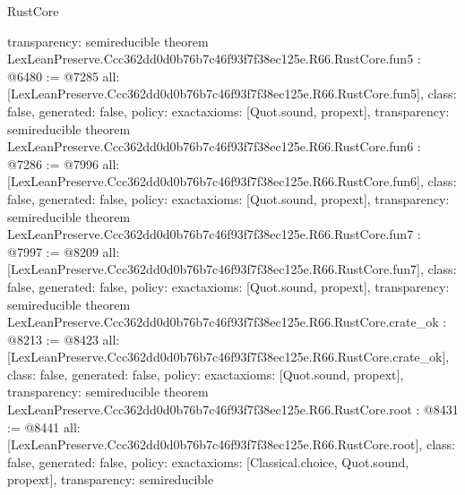 \begin{lexlean}{RustCore}
\begin{coremodule}
{  transparency: semireducible
}
theorem LexLeanPreserve.Ccc362dd0d0b76b7c46f93f7f38ec125e.R66.RustCore.fun5 : @6480 := @7285 {
  all: [LexLeanPreserve.Ccc362dd0d0b76b7c46f93f7f38ec125e.R66.RustCore.fun5],
  class: false,
  generated: false,
  policy: exact{axioms: [Quot.sound, propext]},
  transparency: semireducible
}
theorem LexLeanPreserve.Ccc362dd0d0b76b7c46f93f7f38ec125e.R66.RustCore.fun6 : @7286 := @7996 {
  all: [LexLeanPreserve.Ccc362dd0d0b76b7c46f93f7f38ec125e.R66.RustCore.fun6],
  class: false,
  generated: false,
  policy: exact{axioms: [Quot.sound, propext]},
  transparency: semireducible
}
theorem LexLeanPreserve.Ccc362dd0d0b76b7c46f93f7f38ec125e.R66.RustCore.fun7 : @7997 := @8209 {
  all: [LexLeanPreserve.Ccc362dd0d0b76b7c46f93f7f38ec125e.R66.RustCore.fun7],
  class: false,
  generated: false,
  policy: exact{axioms: [Quot.sound, propext]},
  transparency: semireducible
}
theorem LexLeanPreserve.Ccc362dd0d0b76b7c46f93f7f38ec125e.R66.RustCore.crate_ok : @8213 := @8423 {
  all: [LexLeanPreserve.Ccc362dd0d0b76b7c46f93f7f38ec125e.R66.RustCore.crate_ok],
  class: false,
  generated: false,
  policy: exact{axioms: [Quot.sound, propext]},
  transparency: semireducible
}
theorem LexLeanPreserve.Ccc362dd0d0b76b7c46f93f7f38ec125e.R66.RustCore.root : @8431 := @8441 {
  all: [LexLeanPreserve.Ccc362dd0d0b76b7c46f93f7f38ec125e.R66.RustCore.root],
  class: false,
  generated: false,
  policy: exact{axioms: [Classical.choice, Quot.sound, propext]},
  transparency: semireducible
}


\end{coremodule}
\end{lexlean}
